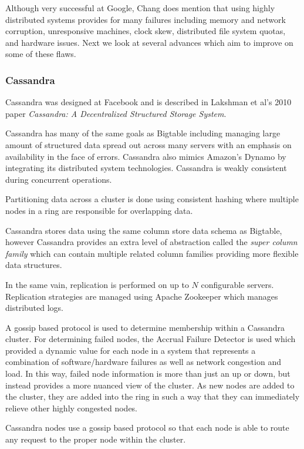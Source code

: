 \documentclass[]{article}
\begin{document}
Although very successful at Google, Chang does mention that using highly distributed systems provides for many failures including memory and network corruption, unresponsive machines, clock skew, distributed file system quotas, and hardware issues. Next we look at several advances which aim to improve on some of these flaws.

\subsubsection{Cassandra}
Cassandra was designed at Facebook and is described in Lakshman et al's 2010 paper \textit{Cassandra: A Decentralized Structured Storage System}\cite{lakshman_cassandra:_2010}.

Cassandra has many of the same goals as Bigtable including managing large amount of structured data spread out across many servers with an emphasis on availability in the face of errors. Cassandra also mimics Amazon's Dynamo by integrating its distributed system technologies\cite{chen_big_2014}. Cassandra is weakly consistent during concurrent operations.

Partitioning data across a cluster is done using consistent hashing where multiple nodes in a ring are responsible for overlapping data.

Cassandra stores data using the same column store data schema as Bigtable, however Cassandra provides an extra level of abstraction called the \textit{super column family} which can contain multiple related column families providing more flexible data structures. 

In the same vain, replication is performed on up to $N$ configurable servers. Replication strategies are managed using Apache Zookeeper which manages distributed logs.

A gossip based protocol is used to determine membership within a Cassandra cluster. For determining failed nodes, the Accrual Failure Detector\cite{hayashibara2004spl} is used which provided a dynamic value for each node in a system that represents a combination of software/hardware failures as well as network congestion and load. In this way, failed node information is more than just an up or down, but instead provides a more nuanced view of the cluster. As new nodes are added to the cluster, they are added into the ring in such a way that they can immediately relieve other highly congested nodes.

Cassandra nodes use a gossip based protocol so that each node is able to route any request to the proper node within the cluster.
\end{document}
